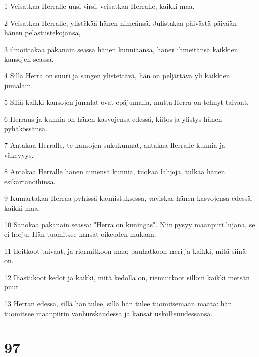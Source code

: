 \par 1 Veisatkaa Herralle uusi virsi, veisatkaa Herralle, kaikki maa.
\par 2 Veisatkaa Herralle, ylistäkää hänen nimeänsä. Julistakaa päivästä päivään hänen pelastustekojansa,
\par 3 ilmoittakaa pakanain seassa hänen kunniaansa, hänen ihmeitänsä kaikkien kansojen seassa.
\par 4 Sillä Herra on suuri ja sangen ylistettävä, hän on peljättävä yli kaikkien jumalain.
\par 5 Sillä kaikki kansojen jumalat ovat epäjumalia, mutta Herra on tehnyt taivaat.
\par 6 Herraus ja kunnia on hänen kasvojensa edessä, kiitos ja ylistys hänen pyhäkössänsä.
\par 7 Antakaa Herralle, te kansojen sukukunnat, antakaa Herralle kunnia ja väkevyys.
\par 8 Antakaa Herralle hänen nimensä kunnia, tuokaa lahjoja, tulkaa hänen esikartanoihinsa.
\par 9 Kumartakaa Herraa pyhässä kaunistuksessa, vaviskaa hänen kasvojensa edessä, kaikki maa.
\par 10 Sanokaa pakanain seassa: "Herra on kuningas". Niin pysyy maanpiiri lujana, se ei horju. Hän tuomitsee kansat oikeuden mukaan.
\par 11 Iloitkoot taivaat, ja riemuitkoon maa; pauhatkoon meri ja kaikki, mitä siinä on.
\par 12 Ihastukoot kedot ja kaikki, mitä kedolla on, riemuitkoot silloin kaikki metsän puut
\par 13 Herran edessä, sillä hän tulee, sillä hän tulee tuomitsemaan maata: hän tuomitsee maanpiirin vanhurskaudessa ja kansat uskollisuudessansa.

\chapter{97}

